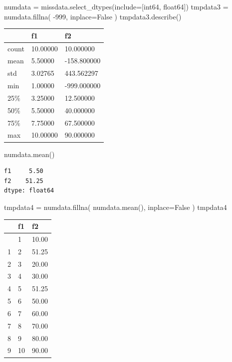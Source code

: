 \documentclass[
  a4paper,
  DIV=11,
  numbers=noendperiod]{scrreprt}
\newenvironment{Shaded}{\begin{snugshade}}{\end{snugshade}}
\newcommand{\DecValTok}[1]{\textcolor[rgb]{0.68,0.00,0.00}{#1}}
\newcommand{\NormalTok}[1]{\textcolor[rgb]{0.00,0.23,0.31}{#1}}
\newcommand{\OperatorTok}[1]{\textcolor[rgb]{0.37,0.37,0.37}{#1}}
\newcommand{\StringTok}[1]{\textcolor[rgb]{0.13,0.47,0.30}{#1}}
\newcommand{\VariableTok}[1]{\textcolor[rgb]{0.07,0.07,0.07}{#1}}
\begin{document}
\begin{Shaded}
\begin{Highlighting}[]
\NormalTok{numdata }\OperatorTok{=}\NormalTok{ missdata.select\_dtypes(include}\OperatorTok{=}\NormalTok{[}\StringTok{\textquotesingle{}int64\textquotesingle{}}\NormalTok{, }\StringTok{\textquotesingle{}float64\textquotesingle{}}\NormalTok{])}
\NormalTok{tmpdata3 }\OperatorTok{=}\NormalTok{ numdata.fillna( }\OperatorTok{{-}}\DecValTok{999}\NormalTok{, inplace}\OperatorTok{=}\VariableTok{False}\NormalTok{ )}
\NormalTok{tmpdata3.describe()}
\end{Highlighting}
\end{Shaded}

\begin{longtable}[]{@{}lll@{}}
\toprule\noalign{}
& f1 & f2 \\
\midrule\noalign{}
\endhead
\bottomrule\noalign{}
\endlastfoot
count & 10.00000 & 10.000000 \\
mean & 5.50000 & -158.800000 \\
std & 3.02765 & 443.562297 \\
min & 1.00000 & -999.000000 \\
25\% & 3.25000 & 12.500000 \\
50\% & 5.50000 & 40.000000 \\
75\% & 7.75000 & 67.500000 \\
max & 10.00000 & 90.000000 \\
\end{longtable}

\begin{Shaded}
\begin{Highlighting}[]
\NormalTok{numdata.mean()}
\end{Highlighting}
\end{Shaded}

\begin{verbatim}
f1     5.50
f2    51.25
dtype: float64
\end{verbatim}

\begin{Shaded}
\begin{Highlighting}[]
\NormalTok{tmpdata4 }\OperatorTok{=}\NormalTok{ numdata.fillna( numdata.mean(), inplace}\OperatorTok{=}\VariableTok{False}\NormalTok{ )}
\NormalTok{tmpdata4}
\end{Highlighting}
\end{Shaded}

\begin{longtable}[]{@{}lll@{}}
\toprule\noalign{}
& f1 & f2 \\
\midrule\noalign{}
\endhead
\bottomrule\noalign{}
\endlastfoot
0 & 1 & 10.00 \\
1 & 2 & 51.25 \\
2 & 3 & 20.00 \\
3 & 4 & 30.00 \\
4 & 5 & 51.25 \\
5 & 6 & 50.00 \\
6 & 7 & 60.00 \\
7 & 8 & 70.00 \\
8 & 9 & 80.00 \\
9 & 10 & 90.00 \\
\end{longtable}
\end{document}
